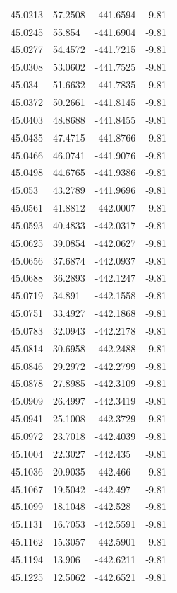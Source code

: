 \begin{table}[H]
\begin{tabular}{llll}
45.0213 & 57.2508 & -441.6594 & -9.81 \\
45.0245 & 55.854 & -441.6904 & -9.81 \\
45.0277 & 54.4572 & -441.7215 & -9.81 \\
45.0308 & 53.0602 & -441.7525 & -9.81 \\
45.034 & 51.6632 & -441.7835 & -9.81 \\
45.0372 & 50.2661 & -441.8145 & -9.81 \\
45.0403 & 48.8688 & -441.8455 & -9.81 \\
45.0435 & 47.4715 & -441.8766 & -9.81 \\
45.0466 & 46.0741 & -441.9076 & -9.81 \\
45.0498 & 44.6765 & -441.9386 & -9.81 \\
45.053 & 43.2789 & -441.9696 & -9.81 \\
45.0561 & 41.8812 & -442.0007 & -9.81 \\
45.0593 & 40.4833 & -442.0317 & -9.81 \\
45.0625 & 39.0854 & -442.0627 & -9.81 \\
45.0656 & 37.6874 & -442.0937 & -9.81 \\
45.0688 & 36.2893 & -442.1247 & -9.81 \\
45.0719 & 34.891 & -442.1558 & -9.81 \\
45.0751 & 33.4927 & -442.1868 & -9.81 \\
45.0783 & 32.0943 & -442.2178 & -9.81 \\
45.0814 & 30.6958 & -442.2488 & -9.81 \\
45.0846 & 29.2972 & -442.2799 & -9.81 \\
45.0878 & 27.8985 & -442.3109 & -9.81 \\
45.0909 & 26.4997 & -442.3419 & -9.81 \\
45.0941 & 25.1008 & -442.3729 & -9.81 \\
45.0972 & 23.7018 & -442.4039 & -9.81 \\
45.1004 & 22.3027 & -442.435 & -9.81 \\
45.1036 & 20.9035 & -442.466 & -9.81 \\
45.1067 & 19.5042 & -442.497 & -9.81 \\
45.1099 & 18.1048 & -442.528 & -9.81 \\
45.1131 & 16.7053 & -442.5591 & -9.81 \\
45.1162 & 15.3057 & -442.5901 & -9.81 \\
45.1194 & 13.906 & -442.6211 & -9.81 \\
45.1225 & 12.5062 & -442.6521 & -9.81 \\

\end{tabular}
\end{table}
